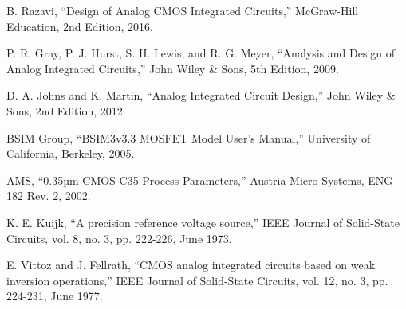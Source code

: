 ﻿\documentclass[12pt,a4paper]{article}
\begin{document}
{}
\begin{thebibliography}{99}
     B. Razavi, ``Design of Analog CMOS Integrated Circuits,'' McGraw-Hill Education, 2nd Edition, 2016.
    
     P. R. Gray, P. J. Hurst, S. H. Lewis, and R. G. Meyer, ``Analysis and Design of Analog Integrated Circuits,'' John Wiley \& Sons, 5th Edition, 2009.
    
     D. A. Johns and K. Martin, ``Analog Integrated Circuit Design,'' John Wiley \& Sons, 2nd Edition, 2012.
    
     BSIM Group, ``BSIM3v3.3 MOSFET Model User's Manual,'' University of California, Berkeley, 2005.
    
     AMS, ``0.35µm CMOS C35 Process Parameters,'' Austria Micro Systems, ENG-182 Rev. 2, 2002.
    
     K. E. Kuijk, ``A precision reference voltage source,'' IEEE Journal of Solid-State Circuits, vol. 8, no. 3, pp. 222-226, June 1973.
    
     E. Vittoz and J. Fellrath, ``CMOS analog integrated circuits based on weak inversion operations,'' IEEE Journal of Solid-State Circuits, vol. 12, no. 3, pp. 224-231, June 1977.
\end{thebibliography}
\end{document}
